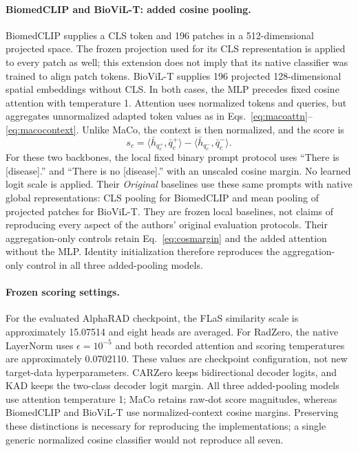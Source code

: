 \documentclass[10pt,twocolumn,letterpaper]{article}
\begin{document}
\paragraph{BiomedCLIP and BioViL-T: added cosine pooling.}
BiomedCLIP supplies a CLS token and 196 patches in a 512-dimensional projected space. The frozen projection used for its CLS representation is applied to every patch as well; this extension does not imply that its native classifier was trained to align patch tokens. BioViL-T supplies 196 projected 128-dimensional spatial embeddings without CLS. In both cases, the MLP precedes fixed cosine attention with temperature 1. Attention uses normalized tokens and queries, but aggregates unnormalized adapted token values as in Eqs.~\eqref{eq:macoattn}--\eqref{eq:macocontext}. Unlike MaCo, the context is then normalized, and the score is
\begin{equation}
s_c=\langle\bar h_{q_c^+},\bar q_c^+\rangle
     -\langle\bar h_{q_c^-},\bar q_c^-\rangle.
\label{eq:cosmargin}
\end{equation}
For these two backbones, the local fixed binary prompt protocol uses ``There is [disease].'' and ``There is no [disease].'' with an unscaled cosine margin. No learned logit scale is applied. Their \emph{Original} baselines use these same prompts with native global representations: CLS pooling for BiomedCLIP and mean pooling of projected patches for BioViL-T. They are frozen local baselines, not claims of reproducing every aspect of the authors' original evaluation protocols. Their aggregation-only controls retain Eq.~\eqref{eq:cosmargin} and the added attention without the MLP. Identity initialization therefore reproduces the aggregation-only control in all three added-pooling models.

\paragraph{Frozen scoring settings.}
For the evaluated AlphaRAD checkpoint, the FLaS similarity scale is approximately 15.07514 and eight heads are averaged. For RadZero, the native LayerNorm uses $\epsilon=10^{-5}$ and both recorded attention and scoring temperatures are approximately 0.0702110. These values are checkpoint configuration, not new target-data hyperparameters. CARZero keeps bidirectional decoder logits, and KAD keeps the two-class decoder logit margin. All three added-pooling models use attention temperature 1; MaCo retains raw-dot score magnitudes, whereas BiomedCLIP and BioViL-T use normalized-context cosine margins. Preserving these distinctions is necessary for reproducing the implementations; a single generic normalized cosine classifier would not reproduce all seven.
\end{document}
